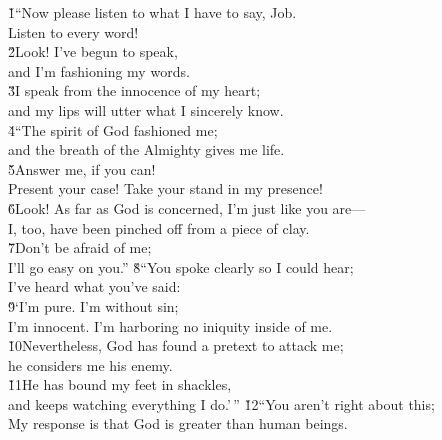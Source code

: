 \begin{poetry}
\poeml {}
\v{1}``Now please listen to what I have to say, Job. \\
\poemll    Listen to every word! \\
\poeml \v{2}Look! I've begun to speak, \\
\poemll    and I'm fashioning my words. \\
\poeml \v{3}I speak from the innocence of my heart; \\
\poemll    and my lips will utter what I sincerely know. \\
\poeml \v{4}``The spirit of God fashioned me; \\
\poemll    and the breath of the Almighty gives me life. \\
\poeml \v{5}Answer me, if you can! \\
\poemll    Present your case! Take your stand in my presence! \\
\poeml \v{6}Look! As far as God is concerned, I'm just like you are--- \\
\poemll    I, too, have been pinched off from a piece of clay. \\
\poeml \v{7}Don't be afraid of me; \\
\poemll    I'll go easy on you.''
\poeml \v{8}``You spoke clearly so I could hear; \\
\poemll    I've heard what you've said: \\
\poeml \v{9}`I'm pure. I'm without sin; \\
\poemll    I'm innocent. I'm harboring no iniquity inside of me. \\
\poeml \v{10}Nevertheless, God has found a pretext to attack me; \\
\poemll    he considers me his enemy. \\
\poeml \v{11}He has bound my feet in shackles, \\
\poemll    and keeps watching everything I do.'\,''
\poeml \v{12}``You aren't right about this; \\
\poemll    My response is that God is greater than human beings. \\

\end{poetry}
